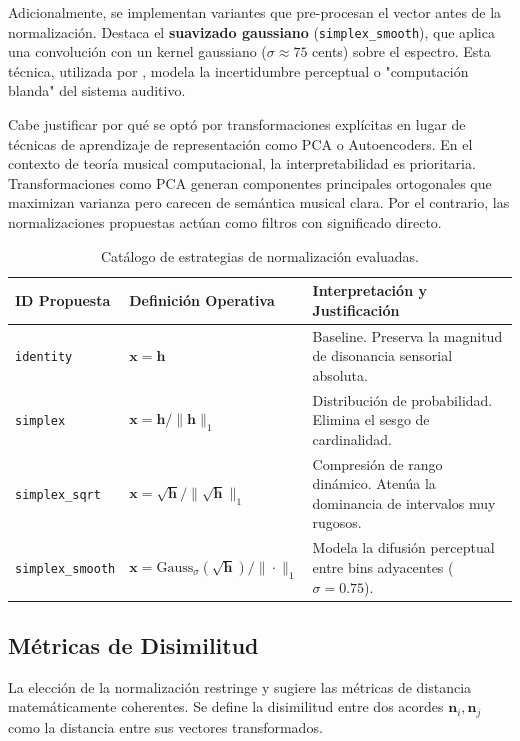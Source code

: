 Adicionalmente, se implementan variantes que pre-procesan el vector antes de la normalización. Destaca el \textbf{suavizado gaussiano} (\texttt{simplex\_smooth}), que aplica una convolución con un kernel gaussiano ($\sigma \approx 75$ cents) sobre el espectro. Esta técnica, utilizada por , modela la incertidumbre perceptual o "computación blanda" del sistema auditivo.

Cabe justificar por qué se optó por transformaciones explícitas en lugar de técnicas de aprendizaje de representación como PCA o Autoencoders. En el contexto de teoría musical computacional, la interpretabilidad es prioritaria. Transformaciones como PCA generan componentes principales ortogonales que maximizan varianza pero carecen de semántica musical clara. Por el contrario, las normalizaciones propuestas actúan como filtros con significado directo.

\begin{table}[h]
\centering
\small
\begin{tabular}{|l|p{5cm}|p{6cm}|}
\hline
\textbf{ID Propuesta} & \textbf{Definición Operativa} & \textbf{Interpretación y Justificación} \\ \hline
\texttt{identity} & $\mathbf{x} = \mathbf{h}$ & Baseline. Preserva la magnitud de disonancia sensorial absoluta. \\ \hline
\texttt{simplex} & $\mathbf{x} = \mathbf{h} / \|\mathbf{h}\|_1$ & Distribución de probabilidad. Elimina el sesgo de cardinalidad. \\ \hline
\texttt{simplex\_sqrt} & $\mathbf{x} = \sqrt{\mathbf{h}} / \|\sqrt{\mathbf{h}}\|_1$ & Compresión de rango dinámico. Atenúa la dominancia de intervalos muy rugosos. \\ \hline
\texttt{simplex\_smooth} & $\mathbf{x} = \text{Gauss}_\sigma(\sqrt{\mathbf{h}}) / \|\cdot\|_1$ & Modela la difusión perceptual entre bins adyacentes ($\sigma=0.75$). \\ \hline
\end{tabular}
\caption{Catálogo de estrategias de normalización evaluadas.}
\label{tab:normalizaciones}
\end{table}

\subsection{Métricas de Disimilitud}
\label{sec:metricas_disimilitud}

La elección de la normalización restringe y sugiere las métricas de distancia matemáticamente coherentes. Se define la disimilitud entre dos acordes $\mathbf{n}_i, \mathbf{n}_j$ como la distancia entre sus vectores transformados.

